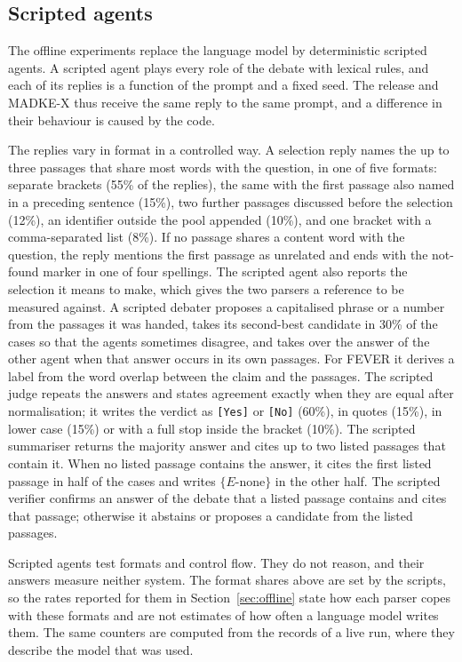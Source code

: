 \subsection{Scripted agents}
The offline experiments replace the language model by deterministic scripted agents. A scripted agent plays every role of the debate with lexical rules, and each of its replies is a function of the prompt and a fixed seed. The release and MADKE-X thus receive the same reply to the same prompt, and a difference in their behaviour is caused by the code.

The replies vary in format in a controlled way. A selection reply names the up to three passages that share most words with the question, in one of five formats: separate brackets (55\% of the replies), the same with the first passage also named in a preceding sentence (15\%), two further passages discussed before the selection (12\%), an identifier outside the pool appended (10\%), and one bracket with a comma-separated list (8\%). If no passage shares a content word with the question, the reply mentions the first passage as unrelated and ends with the not-found marker in one of four spellings. The scripted agent also reports the selection it means to make, which gives the two parsers a reference to be measured against. A scripted debater proposes a capitalised phrase or a number from the passages it was handed, takes its second-best candidate in 30\% of the cases so that the agents sometimes disagree, and takes over the answer of the other agent when that answer occurs in its own passages. For FEVER it derives a label from the word overlap between the claim and the passages. The scripted judge repeats the answers and states agreement exactly when they are equal after normalisation; it writes the verdict as \texttt{[Yes]} or \texttt{[No]} (60\%), in quotes (15\%), in lower case (15\%) or with a full stop inside the bracket (10\%). The scripted summariser returns the majority answer and cites up to two listed passages that contain it. When no listed passage contains the answer, it cites the first listed passage in half of the cases and writes $\{E\text{-none}\}$ in the other half. The scripted verifier confirms an answer of the debate that a listed passage contains and cites that passage; otherwise it abstains or proposes a candidate from the listed passages.

Scripted agents test formats and control flow. They do not reason, and their answers measure neither system. The format shares above are set by the scripts, so the rates reported for them in Section~\ref{sec:offline} state how each parser copes with these formats and are not estimates of how often a language model writes them. The same counters are computed from the records of a live run, where they describe the model that was used.


